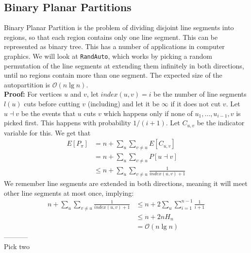 \documentclass[a4paper, fleqn]{article}
\begin{document}
\subsection*{Binary Planar Partitions}
Binary Planar Partition is the problem of dividing disjoint line segments into regions, so that each region contains only one line segment. This can be represented as binary tree. This has a number of applications in computer graphics. We will look at \texttt{RandAuto}, which works by picking a random permutation of the line segments at extending them infinitely in both directions, until no regions contain more than one segment. The expected size of the autopartition is $\mathcal{O}(n\lg n)$. \\
\textbf{Proof:} For vertices $u$ and $v$, let $index(u,v)=i$ be the number of line segments $l(u)$ cuts before cutting $v$ (including) and let it be $\infty$ if it does not cut $v$. Let $u\dashv v$ be the events that $u$ cuts $v$ which happens only if none of $u_1,\ldots, u_{i-1}, v$ is picked first. This happens with probability $1/(i+1)$. Let $C_{u,v}$ be the indicator variable for this. We get that
\begin{align*}
  E[P_\pi] &= n + \sum_u \sum_{v\neq u} E[C_{u,v}] \\
                                             &=  n + \sum_u \sum_{v\neq u} P[u\dashv v] \\
                                             &\leq n+ \sum_u \sum_{v\neq u} \frac{1}{index(u,v)+1}
\end{align*}
We remember line segments are extended in both directions, meaning it will meet other line segments at most once, implying:
\begin{align*}
  n + \sum_u \sum_{v\neq u} \frac{1}{index(u,v)+1} &\leq  n + 2\sum_u \sum_{i=1}^{n-1} \frac{1}{i+1} \\
                                                   &\leq n+ 2nH_n \\
                                                   &= \mathcal{O}(n\lg n)
\end{align*}
$ $ \\
----------- \\
Pick two
\end{document}
